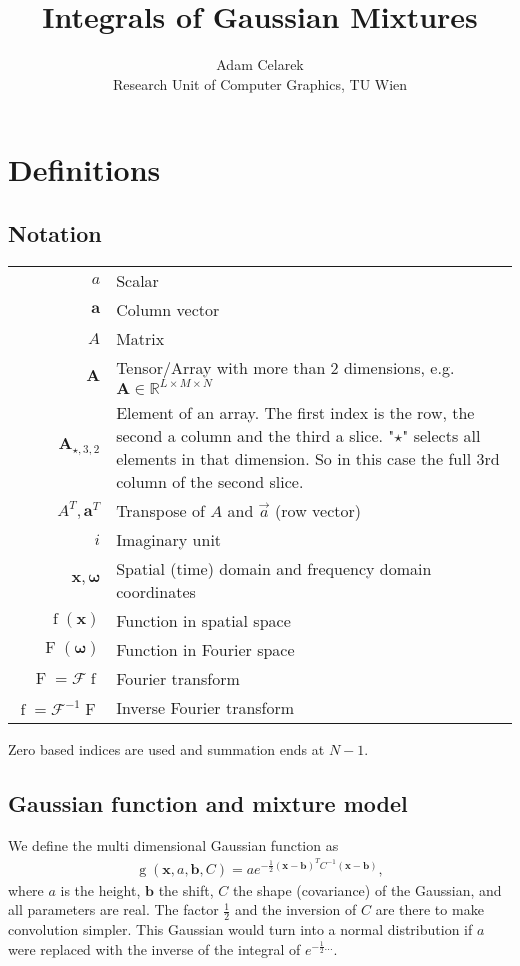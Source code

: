 \documentclass{paper}
\title{Integrals of Gaussian Mixtures}
\author{Adam Celarek\\Research Unit of Computer Graphics, TU Wien}
\newcommand{\F}{\ensuremath{\mathcal{F}}}
\newcommand{\vr}[1]{\ensuremath{\boldsymbol{#1}}}
\newcommand{\tr}[1]{\ensuremath{\boldsymbol{#1}}}
\newcommand{\f}[1]{\operatorname{#1}}
\begin{document}
\maketitle

\section{Definitions}
\subsection*{Notation}
\begin{center}
	\begin{supertabular}{rp{8cm}}
		$a$	& Scalar \\
		$\vr{a}$	& Column vector \\
		$A$			& Matrix \\ 
		$\tr{A}$	& Tensor/Array with more than 2 dimensions, e.g. $\tr{A} \in \mathbb{R}^{L \times M \times N}$ \\ 
		$\tr{A}_{\star, 3, 2}$
					& Element of an array.
					The first index is the row, the second a column and the third a slice.
					"$\star$" selects all elements in that dimension.
					So in this case the full 3rd column of the second slice. \\ 
		$A^T, \vr{a}^T$
					& Transpose of $A$ and $\vec{a}$ (row vector) \\
		$i$			& Imaginary unit \\
		$\vr{x}, \vr{\omega}$
					& Spatial (time) domain and frequency domain coordinates \\
		$\f{f}(\vr{x})$
					& Function in spatial space \\
		$\f{F}(\vr{\omega})$
					& Function in Fourier space \\
		$\f{F} = \F \f{f}$
					& Fourier transform \\
		$\f{f} = \F^{-1} \f{F}$
					& Inverse Fourier transform \\
	\end{supertabular}
\end{center}
Zero based indices are used and summation ends at $N-1$.

\subsection*{Gaussian function and mixture model}
We define the multi dimensional Gaussian function as
\begin{align}
\label{eq:gaussian_definition}
\f{g}(\vr{x}, a, \vr{b}, C) = a e^{-\frac{1}{2}(\vr{x}-\vr{b})^TC^{-1}(\vr{x}-\vr{b})},
\end{align}
where $a$ is the height, $\vr{b}$ the shift, $C$ the shape (covariance) of the Gaussian, and all parameters are real.
The factor $\frac{1}{2}$ and the inversion of $C$ are there to make convolution simpler.
This Gaussian would turn into a normal distribution if $a$ were replaced with the inverse of the integral of $e^{-\frac{1}{2}...}$.
\end{document}

